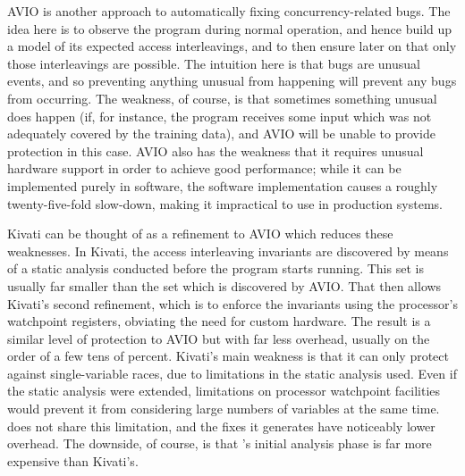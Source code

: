 AVIO\cite{Lu} is another approach to automatically fixing
concurrency-related bugs.  The idea here is to observe the program
during normal operation, and hence build up a model of its expected
access interleavings, and to then ensure later on that only those
interleavings are possible.  The intuition here is that bugs are
unusual events, and so preventing anything unusual from happening will
prevent any bugs from occurring.  The weakness, of course, is that
sometimes something unusual does happen (if, for instance, the program
receives some input which was not adequately covered by the training
data), and AVIO will be unable to provide protection in this case.
AVIO also has the weakness that it requires unusual hardware support
in order to achieve good performance; while it can be implemented
purely in software, the software implementation causes a roughly
twenty-five-fold slow-down, making it impractical to use in production
systems.

Kivati\cite{Chew2010} can be thought of as a refinement to AVIO which
reduces these weaknesses.  In Kivati, the access interleaving
invariants are discovered by means of a static analysis conducted
before the program starts running.  This set is usually far smaller
than the set which is discovered by AVIO.  That then allows Kivati's
second refinement, which is to enforce the invariants using the
processor's watchpoint registers\cite[Chapter 16.2: Debug
  Registers]{Intel2009}, obviating the need for custom hardware.  The
result is a similar level of protection to AVIO but with far less
overhead, usually on the order of a few tens of percent.  Kivati's
main weakness is that it can only protect against single-variable
races, due to limitations in the static analysis used.  Even if the
static analysis were extended, limitations on processor watchpoint
facilities would prevent it from considering large numbers of
variables at the same time.  {\Technique} does not share this
limitation, and the fixes it generates have noticeably lower overhead.
The downside, of course, is that {\technique}'s initial analysis phase
is far more expensive than Kivati's.

